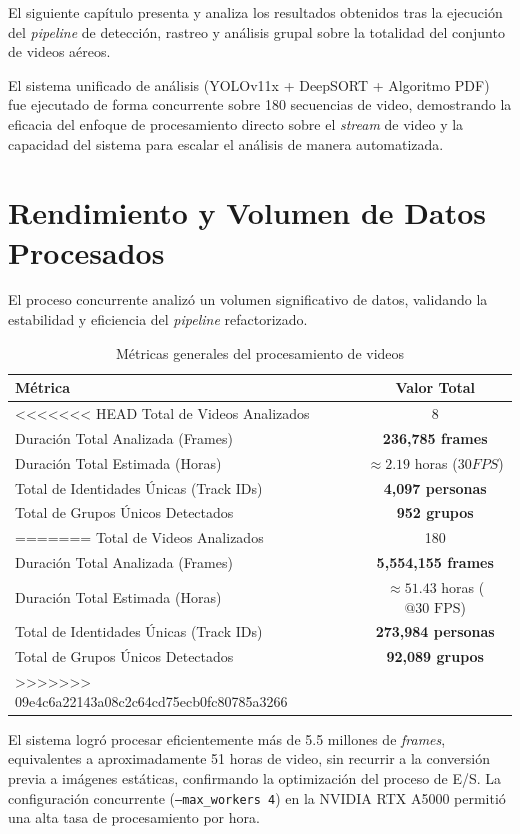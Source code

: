 El siguiente capítulo presenta y analiza los resultados obtenidos tras la ejecución del \textit{pipeline} de detección, rastreo y análisis grupal sobre la totalidad del conjunto de videos aéreos.

El sistema unificado de análisis (YOLOv11x + DeepSORT + Algoritmo PDF) fue ejecutado de forma concurrente sobre 180 secuencias de video, demostrando la eficacia del enfoque de procesamiento directo sobre el \textit{stream} de video y la capacidad del sistema para escalar el análisis de manera automatizada.

\section{Rendimiento y Volumen de Datos Procesados}
El proceso concurrente analizó un volumen significativo de datos, validando la estabilidad y eficiencia del \textit{pipeline} refactorizado.

\begin{table}[h]
	\centering
	\caption{Métricas generales del procesamiento de videos}
	\begin{tabular}{|l|c|}
		\hline
		\textbf{Métrica} & \textbf{Valor Total} \\
		\hline
<<<<<<< HEAD
		Total de Videos Analizados & 8 \\
		Duración Total Analizada (Frames) & \textbf{236,785 frames} \\
		Duración Total Estimada (Horas) & $\approx 2.19$ horas ($30 FPS$) \\
		Total de Identidades Únicas (Track IDs) & \textbf{4,097 personas} \\
		Total de Grupos Únicos Detectados & \textbf{952 grupos} \\
=======
		Total de Videos Analizados & 180 \\
		Duración Total Analizada (Frames) & \textbf{5,554,155 frames} \\
		Duración Total Estimada (Horas) & $\approx 51.43$ horas ($@30\text{ FPS}$) \\
		Total de Identidades Únicas (Track IDs) & \textbf{273,984 personas} \\
		Total de Grupos Únicos Detectados & \textbf{92,089 grupos} \\
>>>>>>> 09e4c6a22143a08c2c64cd75ecb0fc80785a3266
		\hline
	\end{tabular}
\end{table}

El sistema logró procesar eficientemente más de 5.5 millones de \textit{frames}, equivalentes a aproximadamente 51 horas de video, sin recurrir a la conversión previa a imágenes estáticas, confirmando la optimización del proceso de E/S. La configuración concurrente (\texttt{--max\_workers 4}) en la NVIDIA RTX A5000 permitió una alta tasa de procesamiento por hora.

